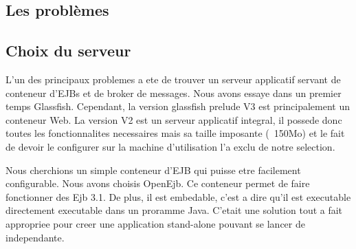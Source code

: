 \subsection{Les problèmes}
\subsection{Choix du serveur}
L'un des principaux problemes a ete de trouver un serveur applicatif servant de conteneur d'EJBs et de broker de messages. Nous avons essaye dans un premier temps Glassfish. Cependant, la version glassfish prelude V3 est principalement un conteneur Web. La version V2 est un serveur applicatif integral, il possede donc toutes les fonctionnalites necessaires mais sa taille imposante (~150Mo) et le fait de devoir le configurer sur la machine d'utilisation l'a exclu de notre selection.

Nous cherchions un simple conteneur d'EJB qui puisse etre facilement configurable. Nous avons choisis OpenEjb. Ce conteneur permet de faire fonctionner des Ejb 3.1. De plus, il est embedable, c'est a dire qu'il est executable directement executable dans un proramme Java. C'etait une solution tout a fait appropriee pour creer une application stand-alone pouvant se lancer de independante.
\subsection{}


